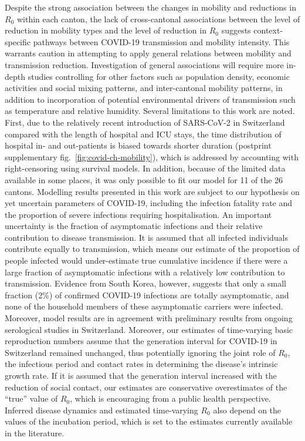   Despite the strong association between the changes in mobility and reductions in $R_0$ within each canton, the lack of cross-cantonal associations between the level of reduction in mobility types and the level of reduction in $R_0$ suggests context-specific pathways between COVID-19 transmission and mobility intensity. This warrants caution in attempting to apply general relations between mobility and transmission reduction. Investigation of general associations will require more in-depth studies controlling for other factors such as population density, economic activities and social mixing patterns, and inter-cantonal mobility patterns, in addition to incorporation of potential environmental drivers of transmission such as temperature and relative humidity\cite{Neher:PotentialImpactSeasonal:2020, Kissler:ProjectingTransmissionDynamics:2020}. Several limitations to this work are noted. First, due to the relatively recent introduction of SARS-CoV-2 in Switzerland compared with the length of hospital and ICU stays, the time distribution of hospital in- and out-patients is biased towards shorter duration (postprint supplementary fig.~\ref{fig:covid-ch-mobility}), which is addressed by accounting with right-censoring using survival models. In addition, because of the limited data available in some places, it was only possible to fit our model for 11 of the 26 cantons. Modelling results presented in this work are subject to our hypothesis on yet uncertain parameters of COVID-19, including the infection fatality rate and the proportion of severe infections requiring hospitalisation. An important uncertainty is the fraction of asymptomatic infections and their relative contribution to disease transmission. It is assumed that all infected individuals contribute equally to transmission, which means our estimate of the proportion of people infected would under-estimate true cumulative incidence if there were a large fraction of asymptomatic infections with a relatively low contribution to transmission. Evidence from South Korea, however, suggests that only a small fraction (2\%) of confirmed COVID-19 infections are totally asymptomatic, and none of the household members of these asymptomatic carriers were infected\cite{Park:EarlyReleaseCoronavirus:2020}. Moreover, model results are in agreement with preliminary results from ongoing serological studies in Switzerland\cite{Stringhini:RepeatedSeroprevalenceAntiSARSCoV2:2020}. Moreover, our estimates of time-varying basic reproduction numbers assume that the generation interval for COVID-19 in Switzerland remained unchanged, thus potentially ignoring the joint role of $R_0$, the infectious period and contact rates in determining the disease’s intrinsic growth rate\cite{Yan:SeparateRolesLatent:2008}. If it is assumed that the generation interval increased with the reduction of social contact, our estimates are conservative overestimates of the “true” value of $R_0$, which is encouraging from a public health perspective. Inferred disease dynamics and estimated time-varying $R_0$ also depend on the values of the incubation period, which is set to the estimates currently available in the literature. 
